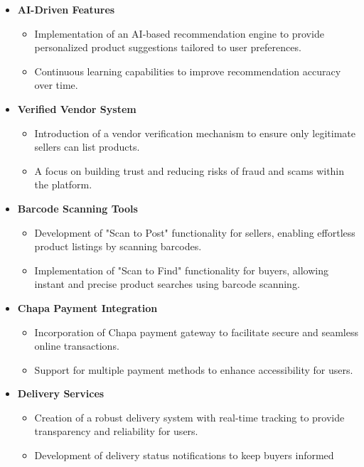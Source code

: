 \documentclass[12pt]{report}
\begin{document}
\begin{itemize}
	\item \textbf{AI-Driven Features}
	      \begin{itemize}
		      \item Implementation of an AI-based recommendation engine to provide
		            personalized product suggestions tailored to user preferences.
		      \item Continuous learning capabilities to improve recommendation accuracy over
		            time.
	      \end{itemize}
	\item \textbf{Verified Vendor System}
	      \begin{itemize}
		      \item Introduction of a vendor verification mechanism to ensure only legitimate
		            sellers can list products.
		      \item A focus on building trust and reducing risks of fraud and scams within the
		            platform.
	      \end{itemize}
	\item \textbf{Barcode Scanning Tools}
	      \begin{itemize}
		      \item Development of "Scan to Post" functionality for sellers, enabling effortless
		            product listings by scanning barcodes.
		      \item Implementation of "Scan to Find" functionality for buyers, allowing instant
		            and precise product searches using barcode scanning.
	      \end{itemize}
	\item \textbf{Chapa Payment Integration}
	      \begin{itemize}
		      \item Incorporation of Chapa payment gateway to facilitate secure and seamless
		            online transactions.
		      \item Support for multiple payment methods to enhance accessibility for users.
	      \end{itemize}
	\item \textbf{Delivery Services}
	      \begin{itemize}
		      \item Creation of a robust delivery system with real-time tracking to provide
		            transparency and reliability for users.
		      \item Development of delivery status notifications to keep buyers informed

\end{itemize}
\end{itemize}
\end{document}

